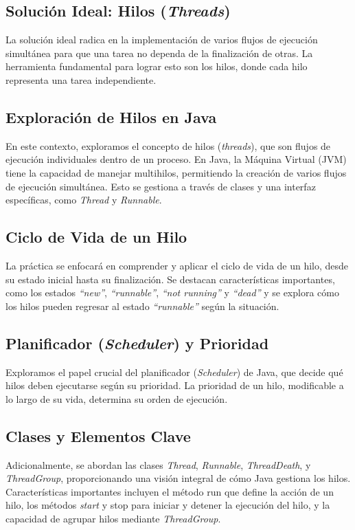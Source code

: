 \documentclass[11pt, twocolumn]{article}
\begin{document}
  \subsection*{Solución Ideal: Hilos (\textit{Threads})}
  La solución ideal radica en la implementación de varios flujos de ejecución simultánea para que una tarea no dependa de la finalización de otras. La herramienta fundamental para lograr esto son los hilos, donde cada hilo representa una tarea independiente.

  \subsection*{Exploración de Hilos en Java}
  En este contexto, exploramos el concepto de hilos (\textit{threads}), que son flujos de ejecución individuales dentro de un proceso. En Java, la Máquina Virtual (JVM) tiene la capacidad de manejar multihilos, permitiendo la creación de varios flujos de ejecución simultánea. Esto se gestiona a través de clases y una interfaz específicas, como \textit{Thread} y \textit{Runnable}.

  \subsection*{Ciclo de Vida de un Hilo}
  La práctica se enfocará en comprender y aplicar el ciclo de vida de un hilo, desde su estado inicial hasta su finalización. Se destacan características importantes, como los estados \textit{``new''}, \textit{``runnable''}, \textit{``not running''} y \textit{``dead''} y se explora cómo los hilos pueden regresar al estado \textit{``runnable''} según la situación.

  \subsection*{Planificador (\textit{Scheduler}) y Prioridad}
  Exploramos el papel crucial del planificador (\textit{Scheduler}) de Java, que decide qué hilos deben ejecutarse según su prioridad. La prioridad de un hilo, modificable a lo largo de su vida, determina su orden de ejecución.

  \subsection*{Clases y Elementos Clave}
  Adicionalmente, se abordan las clases \textit{Thread}, \textit{Runnable}, \textit{ThreadDeath}, y \textit{ThreadGroup}, proporcionando una visión integral de cómo Java gestiona los hilos. Características importantes incluyen el método run que define la acción de un hilo, los métodos \textit{start} y stop para iniciar y detener la ejecución del hilo, y la capacidad de agrupar hilos mediante \textit{ThreadGroup}.
\end{document}
